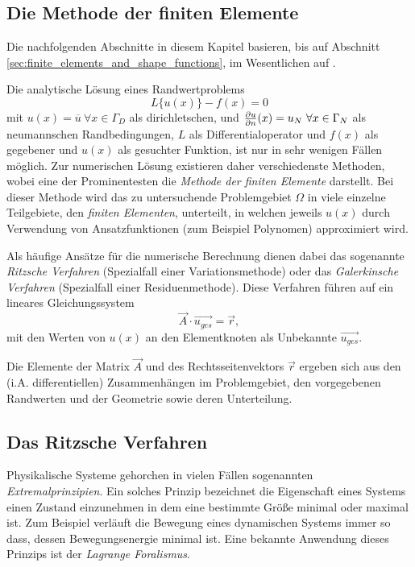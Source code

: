 \subsection{Die Methode der finiten Elemente}
\label{sec:fem_theory}
Die nachfolgenden Abschnitte in diesem Kapitel basieren, bis auf Abschnitt \ref{sec:finite_elements_and_shape_functions}, im Wesentlichen auf \cite{SMS_VO_skript}.\newline

Die analytische Lösung eines Randwertproblems
\begin{equation}
L\{u(x)\} - f(x) = 0
\label{eq:operatorgleichung}
\end{equation}
mit $u(x) = \overline{u} \ \forall x\in \Gamma_D$ als dirichletschen, und $\frac{\partial u}{\partial n}(x) = u_N \ \forall x \in \Gamma_N $ als neumannschen Randbedingungen, $L$ als Differentialoperator und $f(x)$ als gegebener und $u(x)$ als gesuchter Funktion,
ist nur in sehr wenigen Fällen möglich. Zur numerischen Lösung existieren daher verschiedenste Methoden, wobei eine der Prominentesten die \textit{Methode der finiten Elemente} darstellt. Bei dieser Methode wird das zu untersuchende Problemgebiet $\Omega$ in viele einzelne Teilgebiete, den \textit{finiten Elementen}, unterteilt, in welchen jeweils $u(x)$ durch Verwendung von Ansatzfunktionen (zum Beispiel Polynomen) approximiert wird. \newline


Als häufige Ansätze für die numerische Berechnung dienen dabei das sogenannte \textit{Ritzsche Verfahren} (Spezialfall einer Variationsmethode) oder das \textit{Galerkinsche Verfahren} (Spezialfall einer Residuenmethode). Diese Verfahren führen auf ein lineares Gleichungssystem 
\begin{equation}
\vec{A} \cdot \vec{u_{ges}} = \vec{r},
\label{eq:gleichungssystem}
\end{equation}
mit den Werten von $u(x)$ an den Elementknoten als Unbekannte $\vec{u_{ges}}$.



Die Elemente der Matrix $\vec{A}$ und des Rechtsseitenvektors $\vec{r}$ ergeben sich aus den  (i.A. differentiellen) Zusammenhängen im Problemgebiet, den vorgegebenen Randwerten und der Geometrie sowie deren Unterteilung.\newline

\subsection{Das Ritzsche Verfahren}
Physikalische Systeme gehorchen in vielen Fällen sogenannten \textit{Extremalprinzipien}. Ein solches Prinzip bezeichnet die Eigenschaft eines Systems einen Zustand einzunehmen in dem eine bestimmte Größe minimal oder maximal ist. Zum Beispiel verläuft die Bewegung eines dynamischen Systems immer so dass, dessen Bewegungsenergie minimal ist. Eine bekannte Anwendung dieses Prinzips ist der \textit{Lagrange Foralismus}. \cite{technische_mechanik}\newline


